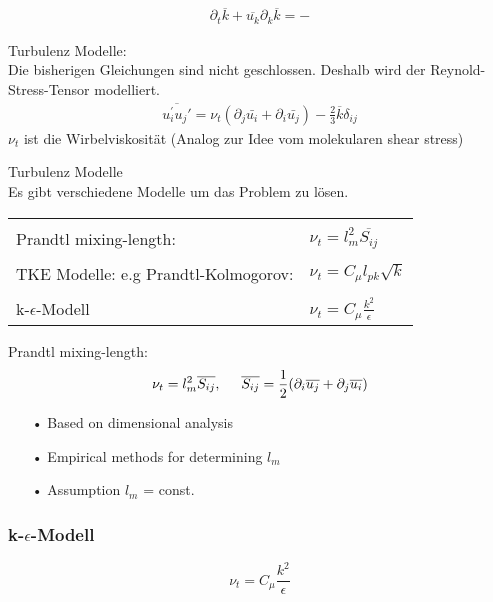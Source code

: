 \documentclass[11pt,t]{beamer}
\newcommand*\mean[1]{\overline{#1}}
\begin{document}
\begin{frame}
\begin{align*}
\partial_t \mean{k} + \mean{u_k}\partial_k \mean{k} = -
\end{align*}

\end{frame}
\begin{frame}
Turbulenz Modelle:\\

Die bisherigen Gleichungen sind nicht geschlossen. Deshalb wird der Reynold-Stress-Tensor modelliert.
\begin{align*}
\overline{u_i^{'}u_j{'}} = \nu_t(\partial_j \bar{u_i} + \partial_i \bar{u_j})-\frac{2}{3}\mean{k}\delta_{ij}
\end{align*}
$\nu_t$ ist die Wirbelviskosität (Analog zur Idee vom molekularen shear stress) 
\end{frame}
\begin{frame}
Turbulenz Modelle\\
Es gibt verschiedene Modelle um das Problem zu lösen. \\
\begin{tabular}{l l}
&\\
Prandtl mixing-length: & $\nu_t = l_m^2\overline{S_{ij}}$\\
&\\
TKE Modelle: e.g Prandtl-Kolmogorov: &$\nu_t = C_\mu l_{pk}\sqrt{k}$\\
&\\
k-$\epsilon$-Modell & $\nu_t = C_\mu \frac{k^2}{\epsilon}$\\
\end{tabular}
\end{frame}
\begin{frame}
Prandtl mixing-length:
\begin{equation}
\nu_t = l_m^2\overline{S_{ij}},\hspace{0.5cm}\overline{S_{ij}} = \frac{1}{2}(\partial_i \overline{u_j} + \partial_j \overline{u_i})
\end{equation}
\begin{itemize}
\item[•]Based on dimensional analysis
\item[•]Empirical methods for determining $l_m$
\item[•]Assumption $l_m$ = const.
\end{itemize}
\end{frame}
\begin{frame}
\frametitle{k-$\epsilon$-Modell}
\begin{equation}
\nu_t = C_\mu \frac{k^2}{\epsilon}
\end{equation}
\end{frame}




\end{document}
